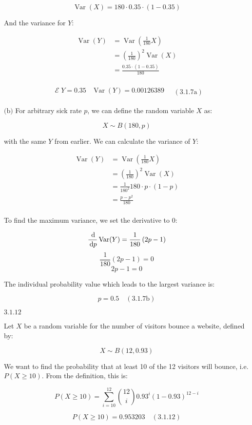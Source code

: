\documentclass{article}
\newcommand{\problem}[2]{$\boxed{\text{#1.#2}}$}
\newcommand{\subproblem}[3]{$\boxed{\text{(#3)}}$}
\newcommand{\solution}[3]{\boxed{#3\quad(\text{#1.#2})}}
\newcommand{\subsolution}[4]{\boxed{#4\quad(\text{#1.#2#3})}}
\renewcommand{\d}[1]{\,\textnormal{d}#1}
\newcommand{\dd}[2]{\frac{\d{#1}}{\d{#2}}}
\DeclareMathOperator{\var}{Var}
\DeclareMathOperator{\E}{\mathcal{E}}
\begin{document}
\[
\var(X)=180\cdot0.35\cdot(1-0.35)
\]

And the variance for $Y$:

\[
\begin{array}{rl}
\var(Y) &= \var\left(\frac{1}{180} X\right) \\
&= \left(\frac{1}{180}\right)^2\var(X) \\
&= \frac{0.35\cdot(1-0.35)}{180} \\
\end{array}
\]

\[
\subsolution{3.1}{7}{a}{\begin{array}{cc}
\E Y=0.35 & \var(Y)=0.00126389 \\
\end{array}}
\]

%
\subproblem{3.1}{7}{b} For arbitrary sick rate $p$, we can define the
random variable $X$ as:

\[
X\sim B(180, p)
\]

with the same $Y$ from earlier. We can calculate the variance of $Y$:

\[
\begin{array}{rl}
\var(Y) &= \var\left(\frac{1}{180} X\right) \\
&= \left(\frac{1}{180}\right)^2 \var(X) \\
&= \frac{1}{180^2} 180\cdot p\cdot (1-p) \\
&= \frac{p-p^2}{180} \\
\end{array}
\]

To find the maximum variance, we set the derivative to $0$:

\[
\dd{}{p}\var(Y) =\frac{1}{180}\left(2p-1\right)
\] \[
\frac{1}{180}\left(2p-1\right)=0
\] \[
2p-1=0
\]

The individual probability value which leads to the largest variance
is:

\[
\subsolution{3.1}{7}{b}{p=0.5}
\]

%
\problem{3.1}{12}

Let $X$ be a random variable for the number of visitors bounce a
website, defined by:

\[
X\sim B(12, 0.93)
\]

We want to find the probability that at least 10 of the 12 visitors
will bounce, i.e. $P(X\ge10)$. From the definition, this is:

\[
P(X\ge10)=\sum\limits_{i=10}^{12} \binom{12}{i} 0.93^i (1-0.93)^{12-i}
\]

\[
\solution{3.1}{12}{P(X\ge10)=0.953203}
\]
\end{document}
